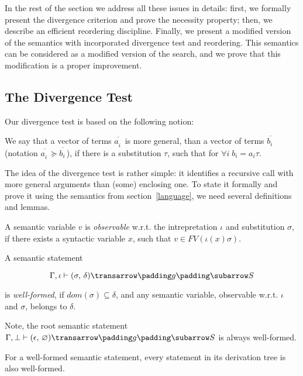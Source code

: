 In the rest of the section we address all these issues in details: first, we formally present the divergence
criterion and prove the necessity property; then, we describe an efficient reordering discipline. Finally, we present a
modified version of the semantics with incorporated divergence test and reordering. This semantics can be
considered as a modified version of the search, and we prove that this modification is a proper improvement.

\subsection{The Divergence Test}

Our divergence test is based on the following notion:

\begin{definition}
\normalfont 
We say that a vector of terms $\overline{a^{\phantom{x}}_i}$ is more general, than a vector of terms $\overline{b^{\phantom{x}}_i}$ (notation 
$\overline{a^{\phantom{x}}_i}\succeq\overline{b^{\phantom{x}}_i}$), if there is a substitution $\tau$, such that for $\forall i\;b_i = a_i \tau$.
\end{definition}

The idea of the divergence test is rather simple: it identifies a recursive call with more general arguments 
than (some) enclosing one. To state it formally and prove it using the semantics from section~\ref{language}, we need several definitions and lemmas.

\begin{definition}
\normalfont
A semantic variable $v$ is \emph{observable} w.r.t. the intrepretation $\iota$ and substitution $\sigma$, if there exists 
a syntactic variable $x$, such that \mbox{$v \in FV(\iota(x) \sigma)$}.
\end{definition}

\begin{definition}
\normalfont
A semantic statement 

$$
\otrans{\Gamma,\iota}{(\sigma,\,\delta)}{g}{S}
$$ 

\noindent is \emph{well-formed}, if \mbox{$dom(\sigma) \subseteq \delta$}, and any semantic variable, observable w.r.t. $\iota$ and $\sigma$, belongs to $\delta$.  
\end{definition}

Note, the root semantic statement \mbox{$\otrans{\Gamma,\bot}{(\epsilon,\,\emptyset)}{g}{S}$} is always well-formed.

\begin{lemma}
\label{one}
\normalfont
 For a well-formed semantic statement, every statement in its derivation tree is also well-formed.
\end{lemma}

